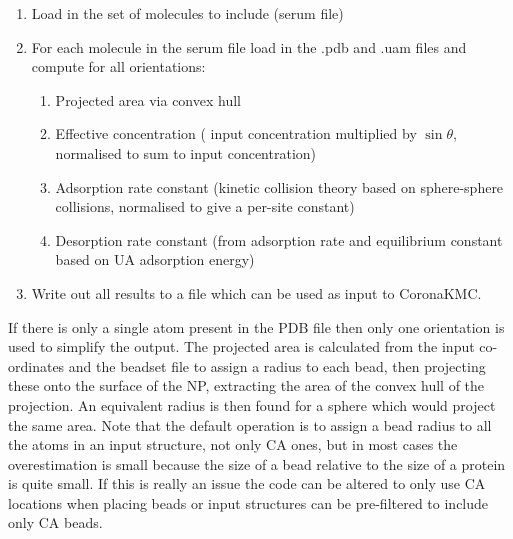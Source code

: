 \documentclass[10pt,a4paper,onecolumn]{report}
\begin{document}
\begin{enumerate}
\item Load in the set of molecules to include (serum file)
\item For each molecule in the serum file load in the .pdb and .uam files and compute for all orientations:
\begin{enumerate}
\item Projected area via convex hull
\item Effective concentration ( input concentration multiplied by $\sin \theta$, normalised to sum to input concentration)
\item Adsorption rate constant (kinetic collision theory based on sphere-sphere collisions, normalised to give a per-site constant)
\item Desorption rate constant (from adsorption rate and equilibrium constant based on UA adsorption energy)
\end{enumerate}
\item Write out all results to a file which can be used as input to CoronaKMC.
 \end{enumerate}
If there is only a single atom present in the PDB file then only one orientation is used to simplify the output. The projected area is calculated from the input co-ordinates and the beadset file to assign a radius to each bead, then projecting these onto the surface of the NP, extracting the area of the convex hull of the projection. An equivalent radius is then found for a sphere which would project the same area. Note that the default operation is to assign a bead radius to all the atoms in an input structure, not only CA ones, but in most cases the overestimation is small because the size of a bead relative to the size of a protein is quite small. If this is really an issue the code can be altered to only use CA locations when placing beads or input structures can be pre-filtered to include only CA beads.
 
\end{document}
